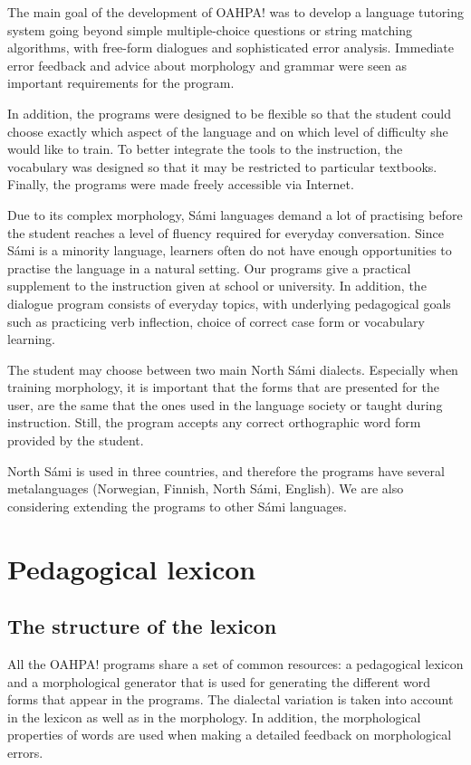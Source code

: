\documentclass[11pt]{article}
\begin{document}
The main goal of the development of OAHPA! was to develop a language tutoring system going beyond simple multiple-choice questions or string matching algorithms, with free-form dialogues and sophisticated error analysis. Immediate error feedback and advice about morphology and grammar were seen as important requirements for the program.

In addition, the programs were designed to be flexible so that the student could choose exactly which aspect of the language and on which level of difficulty she would like to train. To better integrate the tools to the instruction, the vocabulary was designed so that it may be restricted to particular textbooks. Finally, the programs were made freely accessible via Internet.

Due to its complex morphology, Sámi languages demand a lot of practising before the student reaches 
a level of fluency required for everyday conversation. Since Sámi is a minority language, learners often do not have enough opportunities to practise the language in a natural setting. Our programs give a practical supplement to the instruction given at school or university. In addition, the dialogue program consists of everyday topics, with underlying pedagogical goals such as practicing verb inflection, choice of correct case form or vocabulary learning. 

The student may choose between two main North Sámi dialects. Especially when training morphology, it is important that the forms that are presented for the user, are the same that the ones used in the language society or taught during instruction. Still, the program accepts any correct orthographic word form provided by the student.

North Sámi is used in three countries, and therefore the programs have several metalanguages (Norwegian, Finnish, North Sámi, English). We are also considering extending the programs to other Sámi languages.

\section{Pedagogical lexicon}

\subsection{The structure of the lexicon}

All the OAHPA! programs share a set of common resources: a pedagogical lexicon and a morphological generator that is used for generating the different word forms that appear in the programs. The dialectal variation is taken into account in the lexicon as well as in the morphology. In addition, the morphological properties of words are used when making a detailed feedback on morphological errors.
\end{document}

